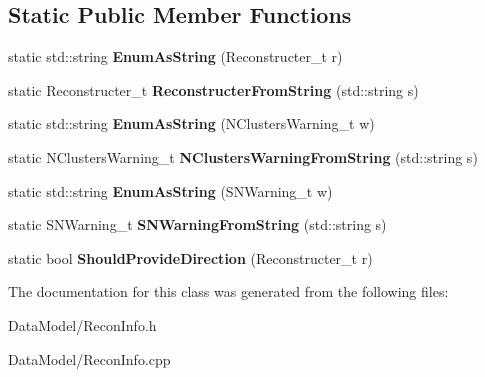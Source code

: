 \subsection*{Static Public Member Functions}
\begin{DoxyCompactItemize}
\item 
\hypertarget{classReconInfo_ac3f741957faf5a7d1c3d21bff107e12a}{static std\-::string {\bfseries Enum\-As\-String} (Reconstructer\-\_\-t r)}\label{classReconInfo_ac3f741957faf5a7d1c3d21bff107e12a}

\item 
\hypertarget{classReconInfo_a76cff9cb354ff64edee198be5339a40e}{static Reconstructer\-\_\-t {\bfseries Reconstructer\-From\-String} (std\-::string s)}\label{classReconInfo_a76cff9cb354ff64edee198be5339a40e}

\item 
\hypertarget{classReconInfo_aa2b43e35c45992db11f8809384602853}{static std\-::string {\bfseries Enum\-As\-String} (N\-Clusters\-Warning\-\_\-t w)}\label{classReconInfo_aa2b43e35c45992db11f8809384602853}

\item 
\hypertarget{classReconInfo_a2f307a0fdbd190822a0377a011c9d379}{static N\-Clusters\-Warning\-\_\-t {\bfseries N\-Clusters\-Warning\-From\-String} (std\-::string s)}\label{classReconInfo_a2f307a0fdbd190822a0377a011c9d379}

\item 
\hypertarget{classReconInfo_a82fd1058a8c3f23498671fcacc96d819}{static std\-::string {\bfseries Enum\-As\-String} (S\-N\-Warning\-\_\-t w)}\label{classReconInfo_a82fd1058a8c3f23498671fcacc96d819}

\item 
\hypertarget{classReconInfo_a498702bd5e2e496f872976f14853b8ea}{static S\-N\-Warning\-\_\-t {\bfseries S\-N\-Warning\-From\-String} (std\-::string s)}\label{classReconInfo_a498702bd5e2e496f872976f14853b8ea}

\item 
\hypertarget{classReconInfo_a9d68ec13cb242350f97d30b7d9257ab4}{static bool {\bfseries Should\-Provide\-Direction} (Reconstructer\-\_\-t r)}\label{classReconInfo_a9d68ec13cb242350f97d30b7d9257ab4}

\end{DoxyCompactItemize}


The documentation for this class was generated from the following files\-:\begin{DoxyCompactItemize}
\item 
Data\-Model/Recon\-Info.\-h\item 
Data\-Model/Recon\-Info.\-cpp\end{DoxyCompactItemize}
